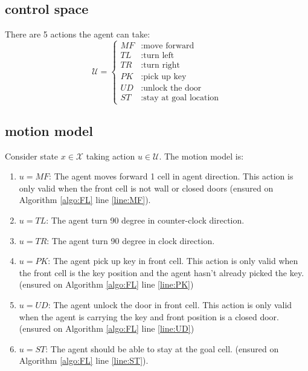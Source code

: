 \documentclass[conference]{IEEEtran}
\begin{document}
\subsection{control space}
There are 5 actions the agent can take:
$$
\mathcal{U}=
\left\{ \begin{aligned}
    MF&:\text{move forward} \\ 
    TL&:\text{turn left} \\ 
    TR&:\text{turn right} \\ 
    PK&:\text{pick up key} \\ 
    UD&:\text{unlock the door} \\
    ST&:\text{stay at goal location} 
\end{aligned} \right. 
$$

\subsection{motion model}
\label{subsec:f}
Consider state $x \in \mathcal{X}$ taking action $u \in \mathcal{U}$.
The motion model is:
\begin{enumerate}    
        \item $u = MF$:
        The agent moves forward 1 cell in agent direction. 
        This action is only valid when the front cell is not wall or closed doors 
        (ensured on Algorithm \ref{algo:FL} line \ref{line:MF}).

        \item $u = TL$:
        The agent turn 90 degree in counter-clock direction.
        
        \item $u = TR$:
        The agent turn 90 degree in clock direction.
        
        \item $u = PK$:
        The agent pick up key in front cell. 
        This action is only valid when the front cell is the key position
        and the agent hasn't already picked the key.
        (ensured on Algorithm \ref{algo:FL} line \ref{line:PK})

        \item $u = UD$:
        The agent unlock the door in front cell.
        This action is only valid when the agent is carrying the key and 
        front position is a closed door.
        (ensured on Algorithm \ref{algo:FL} line \ref{line:UD})

        \item $u = ST$: 
        The agent should be able to stay at the goal cell.
        (ensured on Algorithm \ref{algo:FL} line \ref{line:ST}).
    \end{enumerate}
\end{document}
